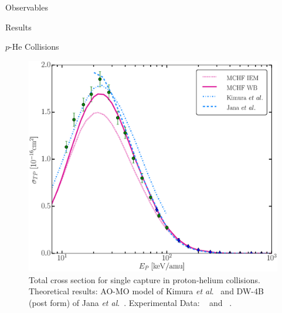 \documentclass[letterpaper, 11 pt]{report}
\begin{document}
\begin{chapter}{Observables \label{chap:p-he2p-he}}
\begin{section}{Results \label{sec:phe2p-res}}
\begin{subsection}{\texorpdfstring{$p$}{p}-He Collisions \label{sec:phe-res}}
\begin{figure}[ht]
\begin{minipage}{.49\linewidth}
               \centering
               \includegraphics[width = \linewidth]{./images/phe/phe-TP.eps}
               \caption[Total cross section for single capture in proton-helium collisions.]
                       {Total cross section for single capture in proton-helium collisions.
                        Theoretical results: AO-MO model of Kimura \textit{et al}.~\cite{KL-86} and
                        DW-4B (post form) of Jana \textit{et al}.~\cite{JMP-15}. Experimental Data:
                        {\color{OliveGreen}{$\bullet$}}~\cite{SG89} and
                        {\color{blue}{$\blacklozenge$}}~\cite{SG85}. \label{fig:phe-tp}}
            \end{minipage} \hspace{0.04\linewidth} %
            \begin{minipage}{.49\linewidth}


\end{minipage}
\end{figure}
\end{subsection}
\end{section}
\end{chapter}
\end{document}
